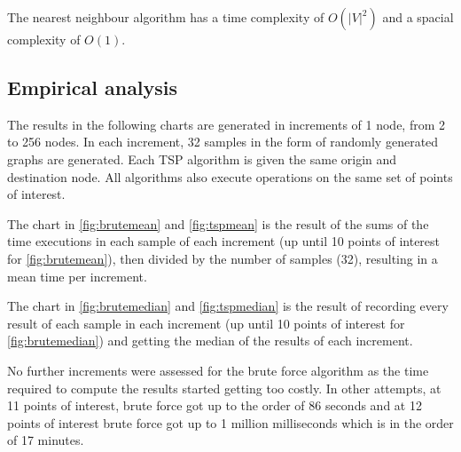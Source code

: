 \documentclass[a4paper, 12pt]{report}
\begin{document}
    The nearest neighbour algorithm has a time complexity of $O(|V|^2)$ and a spacial complexity of $O(1)$.
    
    \subsection{Empirical analysis}
    
    The results in the following charts are generated in increments of 1 node, from 2 to 256 nodes. In each increment, 32 samples in the form of randomly generated graphs are generated. Each TSP algorithm is given the same origin and destination node. All algorithms also execute operations on the same set of points of interest.
    
    The chart in \ref{fig:brutemean} and \ref{fig:tspmean} is the result of the sums of the time executions in each sample of each increment (up until 10 points of interest for \ref{fig:brutemean}), then divided by the number of samples (32), resulting in a mean time per increment.
    
    The chart in \ref{fig:brutemedian} and \ref{fig:tspmedian} is the result of recording every result of each sample in each increment (up until 10 points of interest for \ref{fig:brutemedian}) and getting the median of the results of each increment.
    
    No further increments were assessed for the brute force algorithm as the time required to compute the results started getting too costly. In other attempts, at 11 points of interest, brute force got up to the order of 86 seconds and at 12 points of interest brute force got up to 1 million milliseconds which is in the order of 17 minutes.
            
\end{document}
